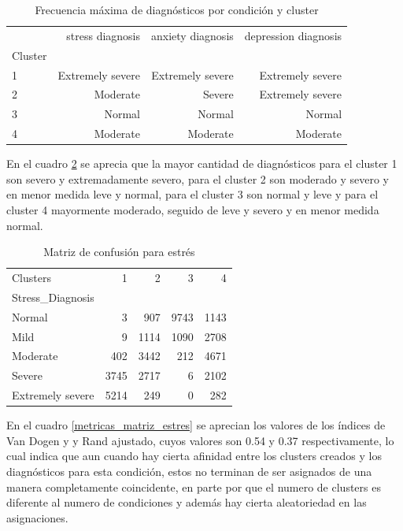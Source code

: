 \begin{table}[ht]
\centering
\caption{Frecuencia máxima de diagnósticos por condición y cluster}
\begin{tabular}{lrrr}
\toprule
{} &  stress diagnosis & anxiety diagnosis & depression diagnosis \\
Cluster &                   &                   &                      \\
\midrule
1       &  Extremely severe &  Extremely severe &  Extremely severe \\
2       &  Moderate &  Severe &  Extremely severe \\
3       &  Normal &  Normal &  Normal \\
4       &  Moderate &  Moderate &  Moderate \\
\bottomrule
\end{tabular}
\label{matriz_cluster_diagnosticos}
\end{table}%
 
En el cuadro \ref{matriz_estres} se aprecia que la mayor cantidad de diagnósticos para el cluster 1 son severo y extremadamente severo, para el cluster 2 son moderado y severo y en menor medida leve y normal, para el cluster 3 son normal y leve y para el cluster 4 mayormente moderado, seguido de leve y severo y en menor medida normal. 

 
\begin{table}[ht]
\centering
\caption{Matriz de confusión para estrés}
\begin{tabular}{lrrrr}
\toprule
Clusters &     1 &     2 &     3 &     4 \\
Stress\_Diagnosis &       &       &       &       \\
\midrule
Normal           &  3 &  907 &  9743 &  1143 \\
Mild             &  9 &  1114 &  1090 &  2708 \\
Moderate         &  402 &  3442 &  212 &  4671 \\
Severe           &  3745 &  2717 &  6 &  2102 \\
Extremely severe &  5214 &  249 &  0 &  282 \\
\bottomrule
\end{tabular}
\label{matriz_estres}
\end{table}%

En el cuadro \ref{metricas_matriz_estres} se aprecian los valores de los índices de Van Dogen y y Rand ajustado, cuyos valores son 0.54 y 0.37 respectivamente, lo cual indica que aun cuando hay cierta afinidad entre los clusters creados y los diagnósticos para esta condición, estos no terminan de ser asignados de una manera completamente coincidente, en parte por que el numero de clusters es diferente al numero de condiciones y además hay cierta aleatoriedad en las asignaciones.


